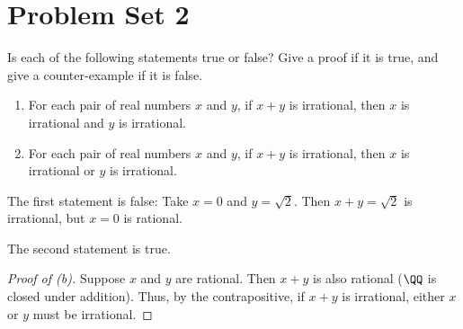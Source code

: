 \section{Problem Set 2}

\begin{problem}
    Is each of the following statements true or false? Give a proof if it is true, and give a counter-example if it is false.

    \begin{enumerate}
        \item For each pair of real numbers $x$ and $y$, if $x + y$ is irrational, then $x$ is irrational and $y$ is irrational.
        \item For each pair of real numbers $x$ and $y$, if $x + y$ is irrational, then $x$ is irrational or $y$ is irrational.
    \end{enumerate}
\end{problem}
\begin{solution}
    The first statement is false: Take $x = 0$ and $y = \sqrt2$. Then $x + y = \sqrt2$ is irrational, but $x = 0$ is rational.

    The second statement is true.
    \begin{proof}[Proof of \textit{(b)}]
        Suppose $x$ and $y$ are rational. Then $x + y$ is also rational ($\QQ$ is closed under addition). Thus, by the contrapositive, if $x + y$ is irrational, either $x$ or $y$ must be irrational.
    \end{proof}
\end{solution}

